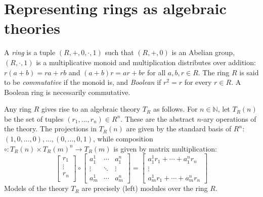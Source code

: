 \documentclass{amsart}
\numberwithin{equation}{section}
\theoremstyle{plain}
\theoremstyle{definition}
\begin{document}
\section{Representing rings as algebraic theories}
\label{sec:repr}
A \emph{ring} is a tuple $(R,+,0,\cdot,1)$ such that $(R,+,0)$ is an Abelian group, $(R, \cdot, 1)$ is a multiplicative monoid and multiplication distributes over addition: 
$r(a + b) = ra + rb$ and $(a+b)r=ar+br$ for all $a, b, r \in R$.
The ring $R$ is said to be \emph{commutative} if the monoid is, and 
\emph{Boolean} if $r^2 = r$ for every $r \in R$. 
A Boolean ring is necessarily commutative. 

Any ring $R$ gives rise to an algebraic theory $T_R$ as follows. 
For $n \in \mathbb{N}$, let $T_R(n)$ be the set of tuples $(r_1, \ldots, r_n) \in R^n$.
These are the abstract $n$-ary operations of the theory.
The projections in $T_R(n)$ are given by the standard basis of $R^n$: $(1,0, \ldots, 0), \ldots, (0, \ldots, 0,1)$, 
while composition $\circ : T_R(n) \times T_R(m)^n \to T_R(m)$ is given by matrix multiplication:
\begin{equation*} 
\begin{bmatrix}
      r_1 \\
      \vdots \\
      r_n \\
      \end{bmatrix} \circ  
      \begin{bmatrix}
      a^1_1 & \cdots & a^n_1 \\
      \vdots & \ddots & \vdots \\
      a^1_m & \cdots & a^n_m
      \end{bmatrix} =
      \begin{bmatrix}
      a^1_1r_1 + \cdots + a^n_1 r_n\\
      \vdots \\
      a^1_mr_1 + \cdots + a^n_m r_n 
      \end{bmatrix}
\end{equation*}
Models of the theory $T_R$ are precisely (left) modules over the ring $R$.
\end{document}
